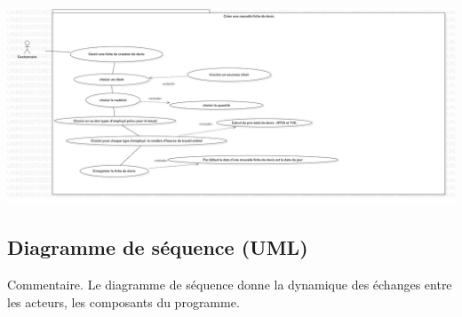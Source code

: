 \begin{center}
\includegraphics[scale=0.25]{use_case/ouvrirNouvelleFicheDevis.jpg} 
\end{center}

\subsection{Diagramme de séquence (UML)}
Commentaire.  Le diagramme de séquence donne la dynamique des échanges entre les acteurs, les composants du programme.

